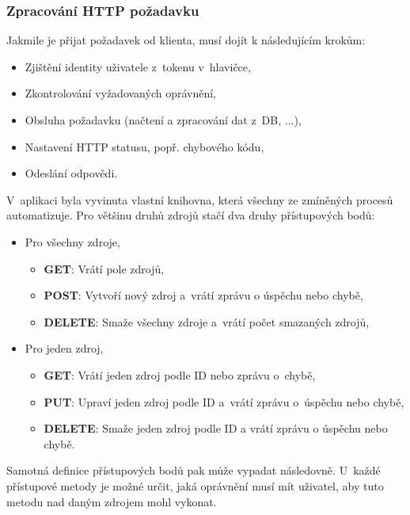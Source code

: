 \documentclass[a4paper,12pt]{article}
\begin{document}
\subsubsection{Zpracování HTTP požadavku}

Jakmile je přijat požadavek od klienta, musí dojít k následujícím krokům:

\begin{itemize}
\item Zjištění identity uživatele z~tokenu v~hlavičce,
\item Zkontrolování vyžadovaných oprávnění,
\item Obsluha požadavku (načtení a zpracování dat z~DB, ...),
\item Nastavení HTTP statusu, popř. chybového kódu,
\item Odeslání odpovědi.
\end{itemize}

V~aplikaci byla vyvinuta vlastní knihovna, která všechny ze zmíněných procesů automatizuje. Pro většinu druhů zdrojů stačí dva druhy přístupových bodů:

\begin{itemize}
\item Pro všechny zdroje,

\begin{itemize}
\item \textbf{GET}: Vrátí pole zdrojů,
\item \textbf{POST}: Vytvoří nový zdroj a~vrátí zprávu o úspěchu nebo chybě,
\item \textbf{DELETE}: Smaže všechny zdroje a~vrátí počet smazaných zdrojů,
\end{itemize}

\item Pro jeden zdroj,

\begin{itemize}
\item \textbf{GET}: Vrátí jeden zdroj podle ID nebo zprávu o~chybě,
\item \textbf{PUT}: Upraví jeden zdroj podle ID a~vrátí zprávu o~úspěchu nebo chybě,
\item \textbf{DELETE}: Smaže jeden zdroj podle ID a vrátí zprávu o úspěchu nebo chybě.
\end{itemize}

\end{itemize}

Samotná definice přístupových bodů pak může vypadat následovně. U~každé přístupové metody je možné určit, jaká oprávnění musí mít uživatel, aby tuto metodu nad daným zdrojem mohl vykonat.
\end{document}

